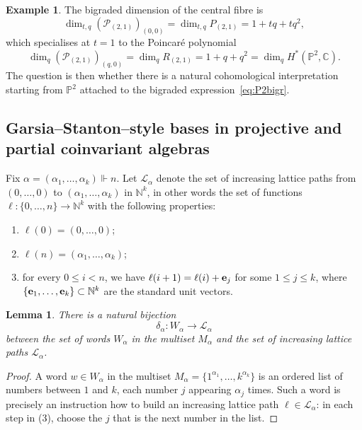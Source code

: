 \documentclass[a4paper,11pt]{amsart}
\theoremstyle{plain}
\newtheorem{lemma}[theorem]{Lemma}
\theoremstyle{definition}
\newtheorem{example}[theorem]{Example}
\newcommand{\N}{\mathbb{N}}
\newcommand{\C}{\mathbb{C}}
\newcommand{\CP}{\mathscr{P}}
\renewcommand{\P}{\mathbb{P}}
\begin{document}
\begin{example}
The bigraded dimension of the central fibre is 
\begin{equation} \label{eq:P2bigr}\dim_{t,q}(\CP_{(2,1)})_{(0, 0)} = \dim_{t,q} P_{(2,1)} = 1 + tq + tq^2, \end{equation}
which specialises at $t=1$ to the Poincar\'e polynomial
\[
\dim_{q}(\CP_{(2,1)})_{(q, 0)} = \dim_{q} R_{(2,1)} =  1 + q + q^2 =  \dim_{q}H^*(\P^2, \C). 
\]
The question is then whether there is a natural cohomological interpretation starting from $\P^2$ attached to the bigraded expression~\eqref{eq:P2bigr}.
\end{example}

\subsection{Garsia--Stanton--style bases in projective and partial coinvariant algebras}\label{sec:bases} 

Fix $\alpha=(\alpha_1, \ldots, \alpha_k)\Vdash n$. Let ${\mathcal L}_\alpha$ denote the set
of increasing lattice paths from $(0,\ldots, 0)$ to $(\alpha_1,\ldots, \alpha_k)$ in $\N^k$, in other words the set of functions
$\ell\colon \{0,\ldots, n\}\to\N^k$ with the following properties: 
\begin{enumerate}
\item $\ell(0)=(0,\ldots, 0)$; 
\item $\ell(n)=(\alpha_1,\ldots, \alpha_k)$; 
\item for every $0\leq i<n$, we have $\ell(i+1)=\ell(i)+{\bf e}_j$ for some $1\leq j\leq k$, where 
$\{{\bf e}_1, \ldots, {\bf e}_k\}\subset\N^k$ are the standard unit vectors. 
\end{enumerate}

\begin{lemma} \label{lemma_paths} There is a natural bijection 
\[\delta_\alpha\colon W_\alpha\to{\mathcal L}_\alpha\] between the set of words $W_\alpha$ in the multiset $M_{\alpha}$ and the set of increasing lattice paths ${\mathcal L}_\alpha$. 
\end{lemma}
\begin{proof} A word $w\in W_\alpha$ in the multiset $M_{\alpha}=\{1^{\alpha_1}, \ldots, k^{\alpha_k}\}$ is an ordered list of numbers between $1$ and $k$, each number $j$ appearing $\alpha_j$ times. Such a word
is precisely an instruction how to build an increasing lattice path $\ell\in{\mathcal L}_\alpha$: in each step in (3), choose the $j$ that is the next number in the list. 
\end{proof}
\end{document}
